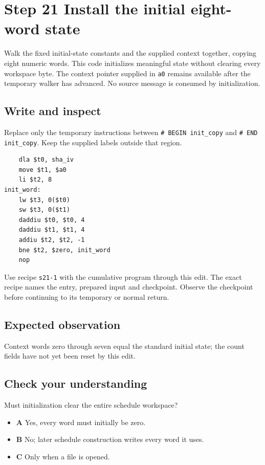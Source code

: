 \section{Step 21 Install the initial eight-word state}\label{sha-s21}

Walk the fixed initial-state constants and the supplied context together, copying eight numeric words. This code initializes meaningful state without clearing every workspace byte. The context pointer supplied in \texttt{a0} remains available after the temporary walker has advanced. No source message is consumed by initialization.

\subsection{Write and inspect}
Replace only the temporary instructions between \texttt{\# BEGIN init\_copy} and \texttt{\# END init\_copy}. Keep the supplied labels outside that region.

\begin{verbatim}
    dla $t0, sha_iv
    move $t1, $a0
    li $t2, 8
init_word:
    lw $t3, 0($t0)
    sw $t3, 0($t1)
    daddiu $t0, $t0, 4
    daddiu $t1, $t1, 4
    addiu $t2, $t2, -1
    bne $t2, $zero, init_word
    nop
\end{verbatim}

Use recipe \texttt{s21-1} with the cumulative program through this edit. The exact recipe names the entry, prepared input and checkpoint. Observe the checkpoint before continuing to its temporary or normal return.

\subsection{Expected observation}
Context words zero through seven equal the standard initial state; the count fields have not yet been reset by this edit.

\subsection{Check your understanding}
Must initialization clear the entire schedule workspace?

\begin{itemize}
  \item \textbf{A} Yes, every word must initially be zero.
  \item \textbf{B} No; later schedule construction writes every word it uses.
  \item \textbf{C} Only when a file is opened.
\end{itemize}
